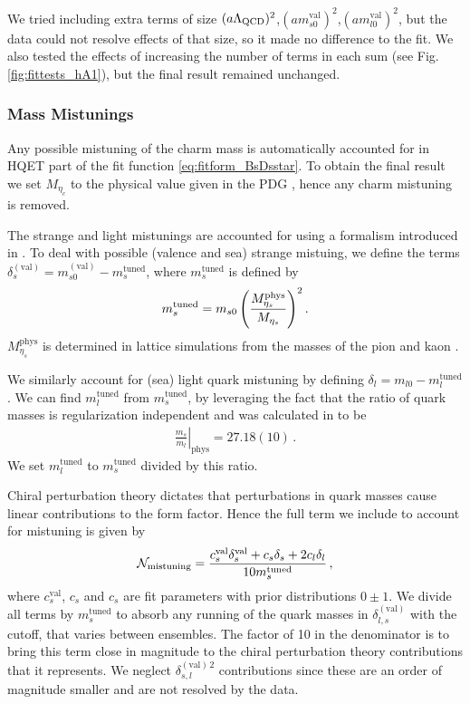 We tried including extra terms of size $(a\Lambda_{\text{QCD}})^2$,$(am^{\text{val}}_{s0})^2$,$(am^{\text{val}}_{l0})^2$, but the data could not resolve effects of that size, so it made no difference to the fit. We also tested the effects of increasing the number of terms in each sum (see Fig. \ref{fig:fittests_hA1}), but the final result remained unchanged.

\subsubsection{Mass Mistunings}
\label{sec:mistuning_BsDsstar}

Any possible mistuning of the charm mass is automatically accounted for in HQET part of the fit function \eqref{eq:fitform_BsDsstar}. To obtain the final result we set $M_{\eta_c}$ to the physical value given in the PDG \cite{PhysRevD.98.030001}, hence any charm mistuning is removed.

The strange and light mistunings are accounted for using a formalism introduced in \cite{Chakraborty:2014aca}. To deal with possible (valence and sea) strange mistuing, we define the terms $\delta^{(\text{val})}_s = m^{(\text{val})}_{s0}- m_s^{\text{tuned}}$, where $m_s^{\text{tuned}}$ is defined by
\begin{align}
  m_s^{\text{tuned}} = m_{s0} \left({ M^{\text{phys}}_{\eta_s} \over M_{\eta_s} }\right)^2.
  \label{eq:strange_mistuning}
\end{align}
$M_{\eta_s}^{\text{phys}}$ is determined in lattice simulations from the masses of the pion and kaon \cite{Dowdall:2013rya}.

We similarly account for (sea) light quark mistuning by defining $\delta_l = m_{l0} - m_l^{\text{tuned}}$. We can find $m_l^{\text{tuned}}$ from $m_s^{\text{tuned}}$, by leveraging the fact that the ratio of quark masses is regularization independent and was calculated in \cite{Bazavov:2017lyh} to be
\begin{align}
  \left.\frac{m_s}{m_l}\right\rvert_{\textrm{phys}} = 27.18(10)\,.
\end{align}
We set $m_l^{\text{tuned}}$ to $m_s^{\text{tuned}}$ divided by this ratio.

Chiral perturbation theory dictates that perturbations in quark masses cause linear contributions to the form factor. Hence the full term we include to account for mistuning is given by
\begin{align}
  \mathcal{N}_{\text{mistuning}} = {c^{\text{val}}_s \delta^{\text{val}}_s + c_s \delta_s + 2 c_l \delta_l \over 10 m_s^{\text{tuned}}}\,,
  \label{eq:mistuning_BsDsstar}
\end{align}
where $c_s^{\text{val}}$, $c_s$ and $c_s$ are fit parameters with prior distributions $0\pm 1$. We divide all terms by $m_s^{\text{tuned}}$ to absorb any running of the quark masses in $\delta_{l,s}^{(\text{val})}$ with the cutoff, that varies between ensembles. The factor of 10 in the denominator is to bring this term close in magnitude to the chiral perturbation theory contributions that it represents. We neglect $\delta^{(\text{val})\,2}_{s,l}$ contributions since these are an order of magnitude smaller and are not resolved by the data.

